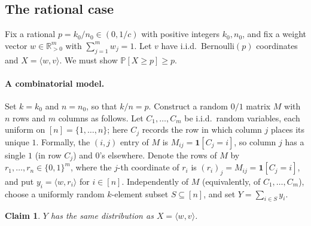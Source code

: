 \documentclass[11pt]{amsart}
\theoremstyle{plain}
\newtheorem{claim}[theorem]{Claim}
\def\bR{\mathbb{R}}
\def\Pb{\mathbb{P}}
\begin{document}
\subsection{The rational case}

Fix a rational $p=k_0/n_0\in(0,1/c)$ with positive integers $k_0,n_0$, and fix a
weight vector $w\in\bR_{>0}^m$ with $\sum_{j=1}^m w_j=1$. Let $v$ have i.i.d.\
$\mathrm{Bernoulli}(p)$ coordinates and $X=\langle w,v\rangle$. We must show
$\Pb[X\ge p]\ge p$.

\paragraph{A combinatorial model.}
Set $k=k_0$ and $n=n_0$, so that $k/n=p$. Construct a random $0/1$ matrix $M$ with
$n$ rows and $m$ columns as follows. Let $C_1,\dots,C_m$ be i.i.d.\ random
variables, each uniform on $[n]=\{1,\dots,n\}$; here $C_j$ records the row in which
column $j$ places its unique $1$. Formally, the $(i,j)$ entry of $M$ is
$M_{ij}=\mathbf 1[C_j=i]$, so column $j$ has a single $1$ (in row $C_j$) and $0$'s
elsewhere. Denote the rows of $M$ by $r_1,\dots,r_n\in\{0,1\}^m$, where the
$j$-th coordinate of $r_i$ is $(r_i)_j=M_{ij}=\mathbf 1[C_j=i]$, and put
$y_i=\langle w,r_i\rangle$ for $i\in[n]$. Independently of $M$ (equivalently, of
$C_1,\dots,C_m$), choose a uniformly random $k$-element subset $S\subseteq[n]$, and
set $Y=\sum_{i\in S}y_i$.

\begin{claim}\label{cl:dist}
$Y$ has the same distribution as $X=\langle w,v\rangle$.
\end{claim}
\end{document}
